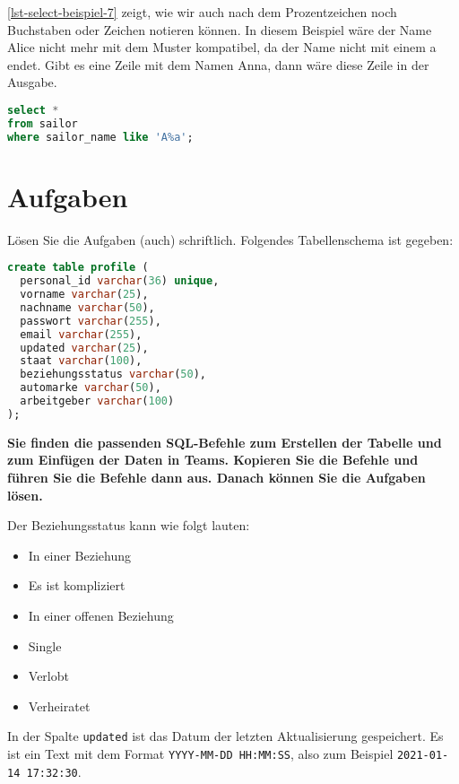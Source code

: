 \autoref{lst-select-beispiel-7} zeigt, wie wir auch nach dem Prozentzeichen noch Buchstaben oder Zeichen notieren können. In diesem Beispiel wäre der Name Alice nicht mehr mit dem Muster kompatibel, da der Name nicht mit einem a endet. Gibt es eine Zeile mit dem Namen Anna, dann wäre diese Zeile in der Ausgabe.

\begin{lstlisting}[language=SQL, upquote=true, morekeywords={real, text, is}, caption={Vor und nach dem Prozentzeichen können beliebige Zeichen notiert werden. Damit können wir das Muster zum Filtern von Text noch genauer definieren.}, label={lst-select-beispiel-7}]
select *
from sailor
where sailor_name like 'A%a';
\end{lstlisting}

\newpage

\section{Aufgaben}

Lösen Sie die Aufgaben (auch) schriftlich. Folgendes Tabellenschema ist gegeben:

\begin{lstlisting}[language=SQL, morekeywords={real, text, is}]
create table profile (
  personal_id varchar(36) unique,
  vorname varchar(25),
  nachname varchar(50),
  passwort varchar(255),
  email varchar(255),
  updated varchar(25),
  staat varchar(100),
  beziehungsstatus varchar(50),
  automarke varchar(50),
  arbeitgeber varchar(100)
);
\end{lstlisting}

\textbf{Sie finden die passenden SQL-Befehle zum Erstellen der Tabelle und zum Einfügen der Daten in Teams. Kopieren Sie die Befehle und führen Sie die Befehle dann aus. Danach können Sie die Aufgaben lösen.}

Der Beziehungsstatus kann wie folgt lauten:

\begin{itemize}
\item In einer Beziehung
\item Es ist kompliziert
\item In einer offenen Beziehung
\item Single
\item Verlobt
\item Verheiratet
\end{itemize}

In der Spalte \lstinline{updated} ist das Datum der letzten Aktualisierung gespeichert. Es ist ein Text mit dem Format \texttt{YYYY-MM-DD HH:MM:SS}, also zum Beispiel \lstinline{2021-01-14 17:32:30}.

